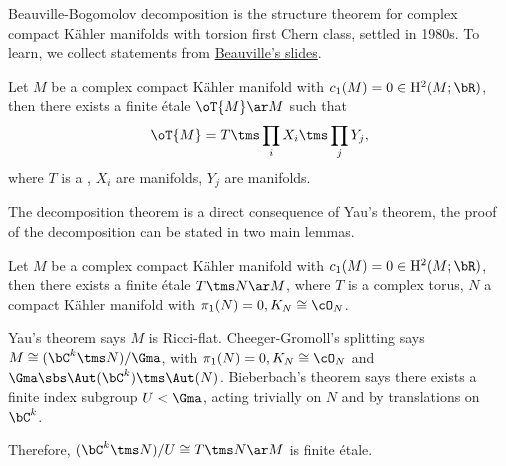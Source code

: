 \documentclass[a4paper, twoside]{article}
\begin{document}
\ifmain
    \title{}
    \author{Cong Wen, 09/24}
    \makeatletter
    \makeatother


    \tableofcontents
\fi



Beauville-Bogomolov decomposition\cite{Bogomolov1974,Beauville1983Kahler} is the structure theorem for complex compact K{\"a}hler manifolds with torsion first Chern class, settled in 1980s. To learn, we collect statements from \href{https://math.unice.fr/~beauvill/conf/decomp.pdf}{Beauville's slides}.


\begin{thm}
	Let $M$ be a complex compact K{\"a}hler manifold with $c_{1}(M)=0\in \mathrm{H}_{}^{2}(M;\bR)$, then there exists a finite {\'e}tale $\oT{M}\ar M$ such that
	\[
		\oT{M}=T\tms\prod_{i}X_{i}\tms\prod_{j} Y_{j},
	\]
	where $T$ is a , $X_{i}$ are  manifolds, $Y_{j}$ are  manifolds.
\end{thm}


The decomposition theorem is a direct consequence of Yau's theorem\cite{Yau1978}, the proof of the decomposition can be stated in two main lemmas.


\begin{lem}
	Let $M$ be a complex compact K{\"a}hler manifold with $c_{1}(M)=0\in \mathrm{H}_{}^{2}(M;\bR)$, then there exists a finite {\'e}tale $T\tms N\ar M$, where $T$ is a complex torus, $N$ a compact K{\"a}hler manifold with $\pi_{1}(N)=0, K_{N}\cong\cO_{N}$.
\end{lem}

\begin{prf}
	Yau's theorem says $M$ is Ricci-flat. Cheeger-Gromoll's splitting says $M\cong(\bC^{k}\tms N)/\Gma$, with $\pi_{1}(N)=0, K_{N}\cong\cO_{N}$ and $\Gma\sbs\Aut(\bC^{k})\tms\Aut(N)$. Bieberbach's theorem says there exists a finite index subgroup $U<\Gma$, acting trivially on $N$ and by translations on $\bC^{k}$.

	Therefore, $(\bC^{k}\tms N)/U\cong T\tms N\ar M$ is finite {\'e}tale.
\end{prf}
\end{document}
